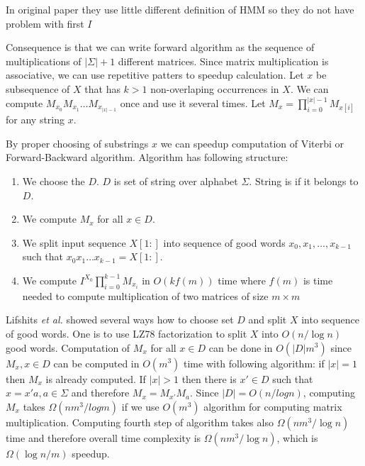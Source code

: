 \begin{note}
In original paper \cite{Lifshits2009} they use little different definition of
HMM so they do not have problem with first $I$

\end{note}

Consequence is that we can write forward algorithm as the sequence of
multiplications of $|\Sigma|+1$ different matrices. Since matrix multiplication
is associative, we can use repetitive patters to speedup calculation. 
Let $x$ be subsequence of $X$ that has $k>1$ non-overlaping occurrences in $X$.
We can compute $M_{x_0}M_{x_1}\dots M_{x_{|x|-1}}$ once and use it several
times. Let $M_{x}=\prod_{i=0}^{|x|-1}M_{x[i]}$ for any string $x$.

By proper choosing of substrings $x$ we can speedup computation of Viterbi or
Forward-Backward algorithm. Algorithm has following structure:
\begin{enumerate}
\item We choose the  $D$. $D$ is set of string over alphabet $\Sigma$. String is
 if it belongs to $D$.
\item We compute $M_x$ for all $x\in D$.
\item We split input sequence $X[1:]$ into sequence of good words
$x_0,x_1,\dots,x_{k-1}$ such that $x_0x_1\dots x_{k-1}=X[1:]$.
\item We compute $I^{X_0}\prod_{i=0}^{k-1}M_{x_i}$ in $O(kf(m))$ time where
$f(m)$ is time needed to compute multiplication of two matrices of size $m\times m$
\end{enumerate}

Lifshits {\it et al.} \cite{Lifshits2009} showed several ways how to choose set
$D$ and split $X$ into sequence of good words. One is to use LZ78 factorization
to split $X$ into $O(n/\log n)$ good words. Computation of $M_x$ for all $x\in
D$ can be done in $O(|D|m^3)$ since $M_x,x\in D$ can be computed in $O(m^3)$
time with following algorithm: if $|x|=1$ then $M_x$ is already computed.
If $|x|>1$ then there is $x'\in D$ such that $x=x'a,a\in \Sigma$ and therefore $M_x =
M_{x'}M_{a}$. Since $|D|=O(n/log n)$, computing $M_x$ takes $\Omega(nm^3/log m)$ if
we use $O(m^3)$ algorithm for computing matrix multiplication. Computing fourth
step of algorithm takes also $\Omega(nm^3/\log n)$ time and therefore overall time complexity
is $\Omega(nm^3/\log n)$, which is $\Omega(\log n/m)$ speedup.

